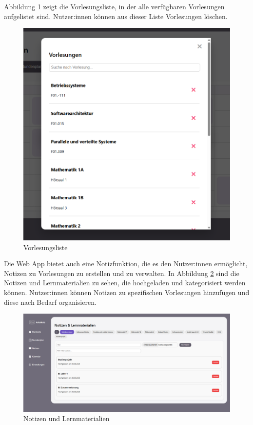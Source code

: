 Abbildung \ref{fig:stundenplan-vorlesungen} zeigt die Vorlesungsliste, in der alle verfügbaren Vorlesungen aufgelistet sind. Nutzer:innen können aus dieser Liste Vorlesungen löschen.
\begin{figure}[H]
  \centering
  \includegraphics[width=1\textwidth]{./images/stundenplan-vorlesungsliste.png}
  \caption{Vorlesungsliste}
  \label{fig:stundenplan-vorlesungen}
\end{figure}

Die Web App bietet auch eine Notizfunktion, die es den Nutzer:innen ermöglicht, Notizen zu Vorlesungen zu erstellen und zu verwalten. In Abbildung \ref{fig:notizen} sind die Notizen und Lernmaterialien zu sehen, die hochgeladen und kategorisiert werden können. Nutzer:innen können Notizen zu spezifischen Vorlesungen hinzufügen und diese nach Bedarf organisieren.\newline
\begin{figure}[H]
  \centering
  \includegraphics[width=1\textwidth]{./images/notizen.png}
  \caption{Notizen und Lernmaterialien}
  \label{fig:notizen}
\end{figure}

